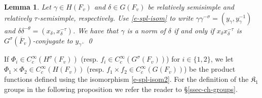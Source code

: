 \documentclass[12pt]{amsart}
\newtheorem{lem}[thm]{Lemma}
\theoremstyle{remark}
\numberwithin{equation}{section}
\theoremstyle{definition}
\renewcommand{\bar}{\overline}
\numberwithin{equation}{subsection}
\begin{document}
\begin{lem} \label{e-spl-lem} Let $\gamma \in H(F_v)$ and $\delta \in G(F_v)$ be relatively semisimple and relatively $\tau$-semisimple, respectively.  Use
\eqref{e-spl-isom} to write
$\gamma\gamma^{-\sigma}=(y_{\gamma},y_{\gamma}^{-1})$ and $\delta\delta^{-\theta}=(x_{\delta},x_{\delta}^{-\tau})$.  We have that $\gamma$ is a norm of $\delta$ if and
only if $x_{\delta}x_{\delta}^{-\tau}$ is $G^{\sigma}(\bar{F}_v)$-conjugate to $y_{\gamma}$. \qed
\end{lem}

If $\Phi_i \in C_c^{\infty}(H^{\sigma}(F_v))$ (resp.
$f_i \in C_c^{\infty}(G^{\sigma}(F_v))$) for $i \in \{1,2\}$, we let
$\Phi_1 \times \Phi_2 \in C_c^{\infty}(H(F_v))$ (resp. $f_1 \times f_2 \in  C_c^{\infty}(G(F_v))$)
be the product functions defined using the isomorphism \eqref{e-spl-isom2}.  For the definition of the $\mathfrak{K}_1$ groups in the following proposition we
refer the reader to \S \ref{ssec-ch-groups}.
\end{document}
